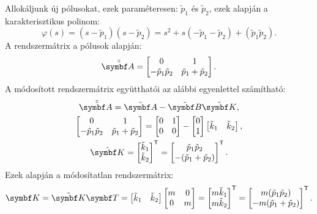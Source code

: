 Allokáljunk új pólusokat, ezek paraméteresen: $\tilde p_1$ és $\tilde p_2$,
ezek alapján a karakterisztikus polinom:
\begin{equation}
  \varphi(s)
  = (s - \tilde p_1)(s - \tilde p_2)
  = s^2
  + s (-\tilde p_1 - \tilde p_2)
  + (\tilde p_1 \tilde p_2).
\end{equation}
A rendszermátrix a pólusok alapján:
\begin{equation}
  \tilde{\tmat A} = \begin{bmatrix}
    0                       & 1                       \\
    - \tilde p_1 \tilde p_2 & \tilde p_1 + \tilde p_2
  \end{bmatrix}.
\end{equation}
A módosított rendszermátrix együtthatói az alábbi egyenlettel számítható:
\begin{gather}
  \tilde{\tmat A} = \tmat A - \tmat B \tmat K,
  \\
  \begin{bmatrix}
    0                       & 1                       \\
    - \tilde p_1 \tilde p_2 & \tilde p_1 + \tilde p_2
  \end{bmatrix} = \begin{bmatrix}
    0 & 1 \\ 0 & 0
  \end{bmatrix} - \begin{bmatrix}
    0 \\ 1
  \end{bmatrix} \begin{bmatrix}
    \tilde k_1 & \tilde k_2
  \end{bmatrix},
  \\
  \tmat K = \begin{bmatrix}
    \tilde k_1 \\
    \tilde k_2
  \end{bmatrix}^\T = \begin{bmatrix}
    \tilde p_1 \tilde p_2 \\
    -(\tilde p_1 + \tilde p_2)
  \end{bmatrix}^\T.
\end{gather}
Ezek alapján a módosítatlan rendszermátrix:
\begin{equation}
  \rmat K
  = \tmat K \rmat T
  = \begin{bmatrix}
    \tilde k_1 & \tilde k_2
  \end{bmatrix} \begin{bmatrix}
    m & 0 \\ 0 & m
  \end{bmatrix} = \begin{bmatrix}
    m \tilde k_1 \\
    m \tilde k_2
  \end{bmatrix}^\T = \begin{bmatrix}
    m (\tilde p_1 \tilde p_2) \\
    -m (\tilde p_1 + \tilde p_2)
  \end{bmatrix}^\T.
\end{equation}

